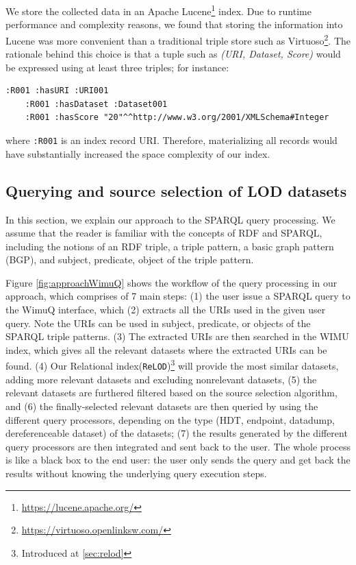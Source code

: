 \documentclass[sw]{iosart2x}
\begin{document}
We store the collected data in an Apache Lucene\footnote{\url{https://lucene.apache.org/}} index.
Due to runtime performance and complexity reasons, we found that storing the information into Lucene was more convenient than a traditional triple store such as Virtuoso\footnote{\url{https://virtuoso.openlinksw.com/}}.
The rationale behind this choice is that a tuple such as \emph{(URI, Dataset, Score)} would be expressed using at least three triples; for instance:
\begin{lstlisting}[language=SPARQL]
    :R001 :hasURI :URI001
    :R001 :hasDataset :Dataset001
    :R001 :hasScore "20"^^http://www.w3.org/2001/XMLSchema#Integer
\end{lstlisting}

where \texttt{:R001} is an index record URI. Therefore, materializing all records would have substantially increased the space complexity of our index.

\subsection{Querying and source selection of LOD datasets}
In this section, we explain our approach to the SPARQL query processing. We assume that the reader is familiar with the concepts of RDF and SPARQL, including the notions of an RDF triple, a triple pattern, a basic graph pattern (BGP), and subject, predicate, object of the triple pattern. 

Figure \ref{fig:approachWimuQ} shows the workflow of the query processing in our approach, which comprises of 7 main steps: (1) the user issue a SPARQL query to the WimuQ interface, which (2) extracts all the URIs used in the given user query. Note the URIs can be used in subject, predicate, or objects of the SPARQL triple patterns. (3) The extracted URIs are then searched in the WIMU index, which gives all the relevant datasets where the extracted URIs can be found. (4) Our Relational index(\texttt{ReLOD})\footnote{Introduced at \cref{sec:relod}} will provide the most similar datasets, adding more relevant datasets and excluding nonrelevant datasets, (5) the relevant datasets are furthered filtered based on the source selection algorithm, and (6) the finally-selected relevant datasets are then queried by using the different query processors, depending on the type (HDT, endpoint, datadump, dereferenceable dataset) of the datasets; (7) the results generated by the different query processors are then integrated and sent back to the user. The whole process is like a black box to the end user: the user only sends the query and get back the results without knowing the underlying query execution steps. %
\end{document}

